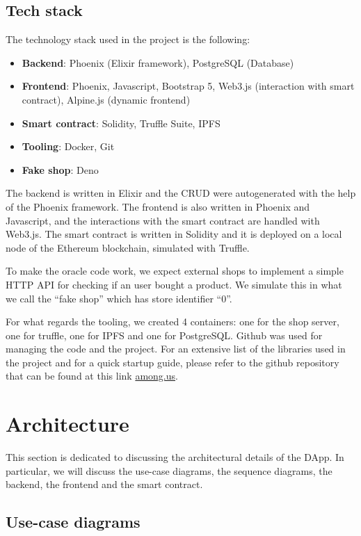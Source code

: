 \documentclass[12pt,a4paper,oneside]{article}
\theoremstyle{definition}
\begin{document}
\subsection{Tech stack}

The technology stack used in the project is the following:
\begin{itemize}
	\item \textbf{Backend}: Phoenix (Elixir framework), PostgreSQL (Database)
	\item \textbf{Frontend}: Phoenix, Javascript, Bootstrap 5, Web3.js (interaction with smart contract), Alpine.js (dynamic frontend)
	\item \textbf{Smart contract}: Solidity, Truffle Suite, IPFS
	\item \textbf{Tooling}: Docker, Git
	\item \textbf{Fake shop}: Deno
\end{itemize}

The backend is written in Elixir and the CRUD were autogenerated with the help of the Phoenix framework. The frontend is also written in Phoenix and Javascript, and the interactions with the smart contract are handled with Web3.js. The smart contract is written in Solidity and it is deployed on a local node of the Ethereum blockchain, simulated with Truffle.

To make the oracle code work, we expect external shops to implement a simple HTTP API for checking if an user bought a product. We simulate this in what we call the ``fake shop'' which has store identifier ``0''.

For what regards the tooling, we created 4 containers: one for the shop server, one for truffle, one for IPFS and one for PostgreSQL. Github was used for managing the code and the project.
For an extensive list of the libraries used in the project and for a quick startup guide, please refer to the github repository that can be found at this link \url{among.us}.

\newpage
\section{Architecture}

This section is dedicated to discussing the architectural details of the DApp. In particular, we will discuss the use-case diagrams, the sequence diagrams, the backend, the frontend and the smart contract.

\subsection{Use-case diagrams}
\end{document}
